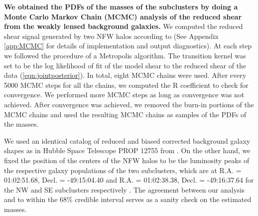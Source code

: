 
\textbf{We obtained the PDFs of the masses of the subclusters by doing a Monte
Carlo Markov Chain (MCMC) analysis of the reduced shear from the
weakly lensed background galaxies. } We computed the reduced shear signal
generated by two NFW halos according to \citet{Umetsu10} (See Appendix
\ref{app:MCMC} for
details of implementation and output diagnostics).
At each step we followed the procedure of a
Metropolis algorithm.  The transition kernel was set to
be the log likelihood of fit of the model shear to the reduced shear of the
data (\ref{eqn:jointposterior}).
In total, eight MCMC chains were used. After every 5000 MCMC steps for all
the chains, we computed the R coefficient \citep{Gelman92}  to
check for convergence. We performed more MCMC steps as long as convergence
was not achieved. After convergence was achieved, we removed the
burn-in portions of the MCMC chains and used the resulting MCMC chains as
samples of the PDFs of the masses. \par 
We used an identical catalog of reduced and biased corrected background 
galaxy shapes as in Hubble Space Telescope PROP 12755 from . On the other hand, we fixed the
position of the centers of the NFW halos to be  the luminosity peaks of the
respective galaxy populations of  the two subclusters, which are at R.A. = 01:02:51.68, Decl. = -49:15:04.40 and R.A. = 01:02:38.38, Decl. = -49:16:37.64 for the NW and SE subclusters
respectively .  The agreement between our analysis and  to within
the 68\% credible interval serves as a sanity check on the estimated masses. 
